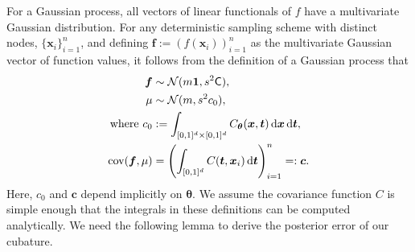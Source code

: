 \documentclass{iitthesis}          %
\newcommand{\bm}[1]{\boldsymbol{#1}}
\newcommand{\dif}[1]{\text{d}{#1}}
\newcommand{\D}[1]{\text{d}{#1}}
\newcommand{\vtheta}{{\bm{\theta}}}
\newcommand{\vc}{\bm{c}}
\newcommand{\vf}{\bm{f}}
\newcommand{\vt}{\bm{t}}
\newcommand{\vx}{\bm{x}}
\newcommand{\vone}{\bm{1}}
\newcommand{\mC}{\mathsf{C}}
\newcommand{\cov}{{\textup{cov}}}
\newcommand{\calN}{\mathcal{N}}
\begin{document}
For a Gaussian process, all vectors of linear functionals of $f$ have a multivariate Gaussian distribution. 
For any deterministic sampling scheme with distinct nodes, $\{\vx_i\}_{i=1}^n$, and defining  $\vf  := \left( f(\vx_i)\right)_{i=1}^n$ as the multivariate Gaussian vector of function values, it follows from the definition of a Gaussian process that 
\begin{subequations} \label{eqn:fGaussDist}
\begin{align}
\vf  & \sim \calN(m \vone, s^2 \mC), \\
\mu & \sim \calN(m, s^2 c_0), 
\\
\text{where }
c_0 &:= \int_{[0,1]^{d} \times [0,1]^{d}} C_\vtheta(\vx,\vt) \, \dif{\vx} \, \dif{\vt}, \\
\cov(\vf, \mu) &= \left(  \int_{[0,1]^d} C(\vt,\vx_i) \, \D \vt \right)_{i=1}^n  =: \vc.
\end{align}
\end{subequations}
Here, $c_0$ and $\vc$ depend implicitly on $\vtheta$.  We assume the covariance function $C$ is simple enough that the integrals in these definitions can be computed analytically.
We need the following lemma to derive the posterior error of our cubature. 
\end{document}

